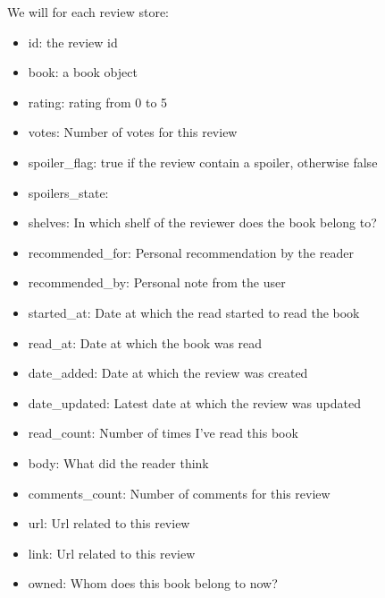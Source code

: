 We will for each review store:
\begin{itemize}
\item id: the review id
\item book: a book object
\item rating: rating from 0 to 5
\item votes: Number of votes for this review
\item spoiler_flag: true if the review contain a spoiler, otherwise false
\item spoilers_state: 
\item shelves: In which shelf of the reviewer does the book belong to?
\item recommended_for: Personal recommendation by the reader
\item recommended_by: Personal note from the user
\item started_at:  Date at which the read started to read the book
\item read_at:  Date at which the book was read
\item date_added: Date at which the review was created
\item date_updated: Latest date at which the review was updated
\item read_count: Number of times I've read this book
\item body: What did the reader think
\item comments_count: Number of comments for this review
\item url: Url related to this review
\item link: Url related to this review
\item owned: Whom does this book belong to now?
\end{itemize}